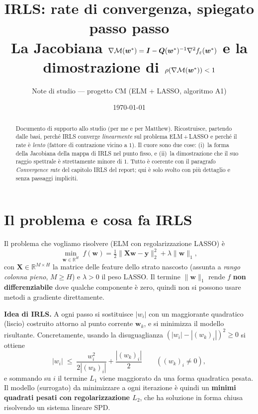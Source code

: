 \documentclass[11pt,a4paper]{article}
\title{\textbf{IRLS: rate di convergenza, spiegato passo passo}\\[2pt]
\large La Jacobiana $\nabla\Mmap(\wstar)=\Id-\Q(\wstar)^{-1}\nabla^2 f_\eps(\wstar)$
e la dimostrazione di $\spec(\nabla\Mmap(\wstar))<1$}
\author{Note di studio --- progetto CM (ELM + LASSO, algoritmo A1)}
\date{\today}
\theoremstyle{definition}
\newcommand{\w}{\bm{w}}
\newcommand{\X}{\bm{X}}
\newcommand{\y}{\bm{y}}
\newcommand{\lam}{\lambda}
\begin{document}
\maketitle

\begin{abstract}
\noindent Documento di supporto allo studio (per me e per Matthew). Ricostruisce, partendo
dalle basi, perché IRLS converge \emph{linearmente} sul problema ELM\,+\,LASSO e perché
il rate è \emph{lento} (fattore di contrazione vicino a $1$). Il cuore sono due cose:
(i)~la forma della Jacobiana della mappa di IRLS nel punto fisso, e (ii)~la dimostrazione
che il suo raggio spettrale è strettamente minore di $1$. Tutto è coerente con il
paragrafo \emph{Convergence rate} del capitolo IRLS del report; qui è solo svolto con più
dettaglio e senza passaggi impliciti.
\end{abstract}

\tableofcontents

\section{Il problema e cosa fa IRLS}

Il problema che vogliamo risolvere (ELM con regolarizzazione LASSO) è
\begin{equation}
\label{eq:problem}
\min_{\w\in\mathbb{R}^H}\; f(\w)=\tfrac12\|\X\w-\y\|_2^2+\lam\|\w\|_1 ,
\end{equation}
con $\X\in\mathbb{R}^{M\times H}$ la matrice delle feature dello strato nascosto (assunta a
\emph{rango colonna pieno}, $M\ge H$) e $\lam>0$ il peso LASSO. Il termine $\|\w\|_1$ rende
$f$ \textbf{non differenziabile} dove qualche componente è zero, quindi non si possono usare
metodi a gradiente direttamente.

\medskip
\noindent\textbf{Idea di IRLS.} A ogni passo si sostituisce $|w_i|$ con un maggiorante
quadratico (liscio) costruito attorno al punto corrente $\w_k$, e si minimizza il modello
risultante. Concretamente, usando la disuguaglianza $(|w_i|-|(w_k)_i|)^2\ge 0$ si ottiene
\[
|w_i|\;\le\;\frac{w_i^2}{2|(w_k)_i|}+\frac{|(w_k)_i|}{2}\qquad((w_k)_i\neq 0),
\]
e sommando su $i$ il termine $L_1$ viene maggiorato da una forma quadratica pesata. Il modello
(surrogato) da minimizzare a ogni iterazione è quindi un \textbf{minimi quadrati pesati con
regolarizzazione $L_2$}, che ha soluzione in forma chiusa risolvendo un sistema lineare SPD.
\end{document}

